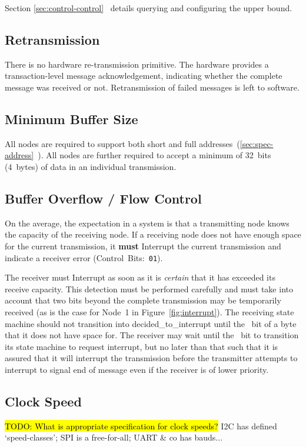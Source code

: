 Section \ref{sec:control-control}~ details
querying and configuring the upper bound.

\subsection{Retransmission}
There is no hardware re-transmission primitive. The hardware provides a
transaction-level message acknowledgement, indicating whether the complete
message was received or not. Retransmission of failed messages is left to
software.

\subsection{Minimum Buffer Size}
All \bus nodes are required to support both short and full
addresses~(\ref{sec:spec-address}~). All \bus nodes
are further required to accept a minimum of 32~bits (4~bytes) of data in an
individual transmission.

\subsection{Buffer Overflow / Flow Control}
On the average, the expectation in a \bus system is that a transmitting node
knows the capacity of the receiving node. If a receiving node does not have
enough space for the current transmission, it {\bf must} Interrupt the current
transmission and indicate a receiver error (Control~Bits:~{\tt 01}).

The receiver must Interrupt as soon as it is {\em certain} that it has
exceeded its receive capacity. This detection must be performed carefully and
must take into account that two bits beyond the complete transmission may be
temporarily received (as is the case for Node~1 in
Figure~\ref{fig:interrupt}). The receiving state machine should not transition
into {\sc decided\_to\_interrupt} until the ~bit of a byte that it does
not have space for. The receiver may wait until the ~bit to transition
its state machine to request interrupt, but no later than that such that it is
assured that it will interrupt the transmission before the transmitter
attempts to interrupt to signal end of message even if the receiver is of
lower priority.

\subsection{Clock Speed}
\hl{TODO: What is appropriate specification for clock speeds?} I2C has defined
`speed-classes'; SPI is a free-for-all; UART \& co has bauds...

